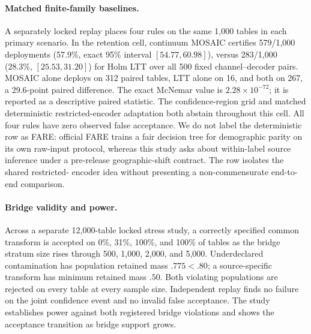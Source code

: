 \paragraph{Matched finite-family baselines.}
A separately locked replay places four rules on the same 1,000 tables in each
primary scenario. In the retention cell, continuum MOSAIC certifies 579/1,000
deployments (57.9\%, exact 95\% interval $[54.77,60.98]$), versus 283/1,000
(28.3\%, $[25.53,31.20]$) for Holm LTT over all 500 fixed
channel--decoder pairs. MOSAIC alone deploys on 312 paired tables, LTT alone on
16, and both on 267, a 29.6-point paired difference. The exact McNemar value
is $2.28\times10^{-72}$; it is reported as a descriptive paired statistic.
The confidence-region grid and matched deterministic restricted-encoder
adaptation both abstain throughout this cell. All four rules have zero observed
false acceptance. We do not label the deterministic row as FARE: official FARE
trains a fair decision tree for demographic parity on its own raw-input
protocol, whereas this study asks about within-label source inference under a
pre-release geographic-shift contract. The row isolates the shared restricted-
encoder idea without presenting a non-commensurate end-to-end comparison.

\paragraph{Bridge validity and power.}
Across a separate 12,000-table locked stress study, a correctly specified
common transform is accepted on 0\%, 31\%, 100\%, and 100\% of tables as the
bridge stratum size rises through 500, 1,000, 2,000, and 5,000. Underdeclared
contamination has population retained mass $.775<.80$; a source-specific
transform has minimum retained mass $.50$. Both violating populations are
rejected on every table at every sample size. Independent replay finds no
failure on the joint confidence event and no invalid false acceptance. The
study establishes power against both registered bridge violations and shows the
acceptance transition as bridge support grows.

